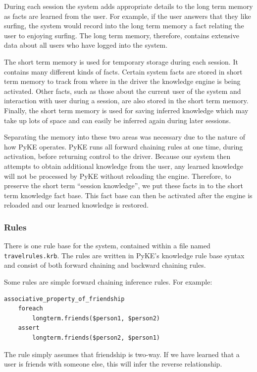 \documentclass[11pt]{article} %
\begin{document}
During each session the system adds appropriate details to the long term memory as facts are learned from the user. For example, if the user answers that they like surfing, the system would record into the long term memory a fact relating the user to enjoying surfing. The long term memory, therefore, contains extensive data about all users who have logged into the system.

The short term memory is used for temporary storage during each session. It contains many different kinds of facts. Certain system facts are stored in short term memory to track from where in the driver the knowledge engine is being activated. Other facts, such as those about the current user of the system and interaction with user during a session, are also stored in the short term memory. Finally, the short term memory is used for saving inferred knowledge which may take up lots of space and can easily be inferred again during later sessions.

Separating the memory into these two areas was necessary due to the nature of how PyKE operates. PyKE runs all forward chaining rules at one time, during activation, before returning control to the driver. Because our system then attempts to obtain additional knowledge from the user, any learned knowledge will not be processed by PyKE without reloading the engine. Therefore, to preserve the short term ``session knowledge'', we put these facts in to the short term knowledge fact base. This fact base can then be activated after the engine is reloaded and our learned knowledge is restored.

\subsubsection{Rules}

There is one rule base for the system, contained within a file named \texttt{travelrules.krb}. The rules are written in PyKE's knowledge rule base syntax and consist of both forward chaining and backward chaining rules.

Some rules are simple forward chaining inference rules.
For example:
\begin{Verbatim}[xleftmargin=2.5cm]
associative_property_of_friendship
    foreach
        longterm.friends($person1, $person2)
    assert
        longterm.friends($person2, $person1)
\end{Verbatim}

The rule simply assumes that friendship is two-way. If we have learned that a user is friends with someone else, this will infer the reverse relationship.
\end{document}
